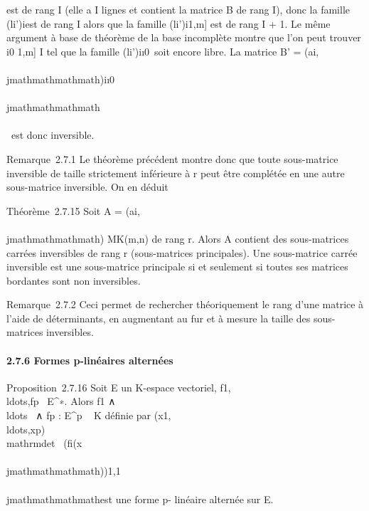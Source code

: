 est de rang \textbar{}I\textbar{} (elle a \textbar{}I\textbar{} lignes
et contient la matrice B de rang \textbar{}I\textbar{}), donc la famille
(li')i\inI est de rang \textbar{}I\textbar{} alors que
la famille (li')i\in{[}1,m{]} est de rang
\textbar{}I\textbar{} + 1. Le même argument à base de théorème de la
base incomplète montre que l'on peut trouver i0 \in {[}1,m{]} \diagdown
I tel que la famille
(li')i\inI\cup\i0\
soit encore libre. La matrice B' =
(ai,\\\\jmathmathmathmath)i\inI\cup\i0\,\\\\jmathmathmathmath\inJ\cup\\\\\
est donc inversible.

Remarque~2.7.1 Le théorème précédent montre donc que toute sous-matrice
inversible de taille strictement inférieure à r peut être complétée en
une autre sous-matrice inversible. On en déduit

Théorème~2.7.15 Soit A = (ai,\\\\jmathmathmathmath) \in MK(m,n) de rang r.
Alors A contient des sous-matrices carrées inversibles de rang r
(sous-matrices principales). Une sous-matrice carrée inversible est une
sous-matrice principale si et seulement si toutes ses matrices bordantes
sont non inversibles.

Remarque~2.7.2 Ceci permet de rechercher théoriquement le rang d'une
matrice à l'aide de déterminants, en augmentant au fur et à mesure la
taille des sous-matrices inversibles.

\paragraph{2.7.6 Formes p-linéaires alternées}

Proposition~2.7.16 Soit E un K-espace vectoriel,
f1,\\ldots,fp~
\in E^∗. Alors f1
∧\\ldots~ ∧
fp : E^p \rightarrow~ K définie par
(x1,\\ldots,xp)\mapsto~\\mathrm{det}~
(fi(x\\\\jmathmathmathmath))1\leqi\leqp,1\leq\\\\jmathmathmathmath\leqp est une forme p-
linéaire alternée sur E.

